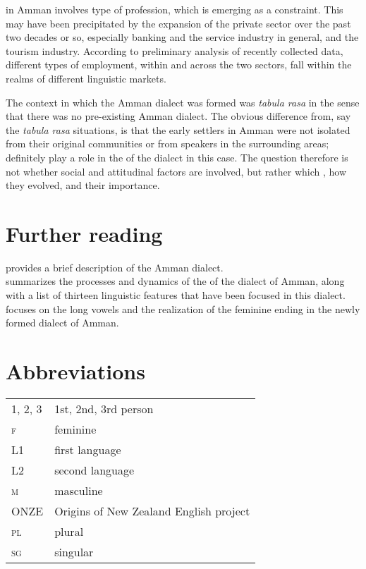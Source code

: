 \documentclass[output=paper]{langsci/langscibook}
\begin{document}
in Amman involves type of profession, which is emerging as a constraint. This may have been precipitated by the expansion of the private sector over the past two decades or so, especially banking and the service industry in general, and the tourism industry. According to preliminary analysis of recently collected data, different types of employment, within and across the two sectors, fall within the realms of different linguistic markets.

The context in which the Amman dialect was formed was \textit{tabula rasa} in the sense that there was no pre-existing Amman dialect. The obvious difference from, say the \textit{tabula rasa}  situations, is that the early settlers in Amman were not isolated from their original communities or from  speakers in the surrounding areas;  definitely play a role in the  of the dialect in this case. The question therefore is not whether social and attitudinal factors are involved, but rather which , how they evolved, and their  importance.

\section*{Further reading}

\citet{Al-Wer2011Amman} provides a brief description of the Amman dialect.\\
\citet{Al-Wer2007} summarizes the processes and dynamics of the  of the dialect of Amman, along with a list of thirteen linguistic features that have been focused in this dialect.\\
\citet{Al-Wer2002furtherreading} focuses on the long vowels and the realization of the feminine ending in the newly formed dialect of Amman.



\section*{Abbreviations}

\begin{tabularx}{1\textwidth}{@{}lQ@{}}
\textsc{1, 2, 3} & 1st, 2nd, 3rd person \\
\textsc{f}  &  feminine\\
L1 & first language \\
L2 & second language \\
\textsc{m}  &  masculine\\
ONZE & Origins of New Zealand {English} project \\
\textsc{pl}  &  plural\\
\textsc{sg}  &  singular\\
\end{tabularx}%


{\sloppy\printbibliography[heading=subbibliography,notkeyword=this]}
\end{document}
